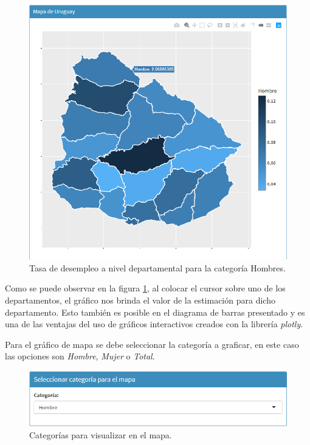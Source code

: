 \documentclass[12pt,twoside,spanish,a4paper]{book}\usepackage[]{graphicx}\usepackage[]{color}
\begin{document}
\begin{figure}[h]
\begin{center}
\includegraphics[width=1\textwidth]{img/Mapa.png}
\caption{Tasa de desempleo a nivel departamental para la categoría Hombres. \label{mapa}}
\end{center}
\end{figure}

Como se puede observar en la figura \ref{mapa}, al colocar el cursor sobre uno de los departamentos, el gráfico nos brinda el valor de la estimación para dicho departamento. Esto también es posible en el diagrama de barras presentado y es una de las ventajas del uso de gráficos interactivos creados con la librería \textit{plotly}.

Para el gráfico de mapa se debe seleccionar la categoría a graficar, en este caso las opciones son \textit{Hombre}, \textit{Mujer} o \textit{Total}. 

\begin{figure}[h]
\begin{center}
\includegraphics[width=1\textwidth]{img/cat_mapa.PNG}
\caption{Categorías para visualizar en el mapa. \label{catmapa}}
\end{center}
\end{figure}
\end{document}
